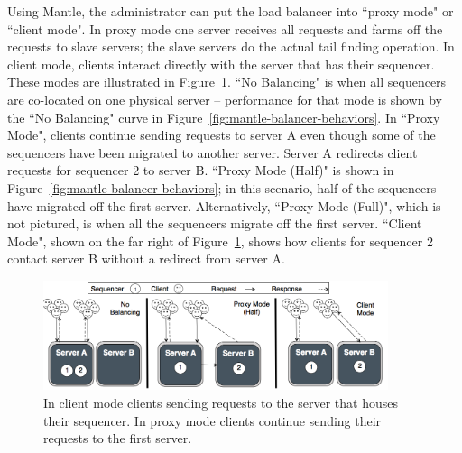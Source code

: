 Using Mantle, the administrator can put the load balancer into ``proxy mode" or
``client mode". In proxy mode one server receives all requests and farms off
the requests to slave servers; the slave servers do the actual tail finding
operation. In client mode, clients interact directly with the server that has
their sequencer.  These modes are illustrated in Figure~\ref{fig:mantle-modes}.
``No Balancing" is when all sequencers are co-located on one physical server --
performance for that mode is shown by the ``No Balancing" curve in
Figure~\ref{fig:mantle-balancer-behaviors}. In ``Proxy Mode", clients continue
sending requests to server A even though some of the sequencers have been
migrated to another server. Server A redirects client requests for sequencer 2
to server B.  ``Proxy Mode (Half)" is shown in
Figure~\ref{fig:mantle-balancer-behaviors}; in this scenario, half of the
sequencers have migrated off the first server. Alternatively, ``Proxy Mode
(Full)", which is not pictured, is when all the sequencers migrate off the
first server.  ``Client Mode", shown on the far right of
Figure~\ref{fig:mantle-modes}, shows how clients for sequencer 2 contact server
B without a redirect from server A.

\begin{figure}[t!]
\centering
\includegraphics[width=0.9\textwidth]{./chapters/controlplane/malacology/figures/mantle-modes.png}
\caption{ In client mode clients sending requests to the server that houses
their sequencer. In proxy mode clients continue sending their requests to the
first server.  }\label{fig:mantle-modes}
\end{figure}

